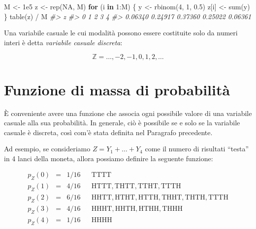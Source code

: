 \documentclass[
  11pt,
]{krantz}
\makeatletter
\newenvironment{Shaded}{\begin{snugshade}}{\end{snugshade}}
\newcommand{\CommentTok}[1]{\textcolor[rgb]{0.37,0.37,0.37}{\textit{#1}}}
\newcommand{\ConstantTok}[1]{\textcolor[rgb]{0,0,0}{#1}}
\newcommand{\ControlFlowTok}[1]{\textcolor[rgb]{0.27,0.27,0.27}{\textbf{#1}}}
\newcommand{\DecValTok}[1]{\textcolor[rgb]{0.06,0.06,0.06}{#1}}
\newcommand{\FloatTok}[1]{\textcolor[rgb]{0.06,0.06,0.06}{#1}}
\newcommand{\FunctionTok}[1]{\textcolor[rgb]{0,0,0}{#1}}
\newcommand{\NormalTok}[1]{#1}
\newcommand{\OtherTok}[1]{\textcolor[rgb]{0.37,0.37,0.37}{#1}}
\newcommand{\SpecialCharTok}[1]{\textcolor[rgb]{0,0,0}{#1}}
\newenvironment{kframe}{%
\medskip{}
\setlength{\fboxsep}{.8em}
 \def\at@end@of@kframe{}%
 \ifinner\ifhmode%
  \def\at@end@of@kframe{\end{minipage}}%
  \begin{minipage}{\columnwidth}%
 \fi\fi%
 \def\FrameCommand##1{\hskip\@totalleftmargin \hskip-\fboxsep
 \colorbox{shadecolor}{##1}\hskip-\fboxsep
     \hskip-\linewidth \hskip-\@totalleftmargin \hskip\columnwidth}%
 \MakeFramed {\advance\hsize-\width
   \@totalleftmargin\z@ \linewidth\hsize
   \@setminipage}}%
 {\par\unskip\endMakeFramed%
 \at@end@of@kframe}
\renewenvironment{Shaded}{\begin{kframe}}{\end{kframe}}
\theoremstyle{definition}
\theoremstyle{definition}
\theoremstyle{definition}
\theoremstyle{definition}
\theoremstyle{remark}
\makeatother
\begin{document}
\begin{Shaded}
\begin{Highlighting}[]
\NormalTok{M }\OtherTok{\textless{}{-}} \FloatTok{1e5}
\NormalTok{z }\OtherTok{\textless{}{-}} \FunctionTok{rep}\NormalTok{(}\ConstantTok{NA}\NormalTok{, M)}
\ControlFlowTok{for}\NormalTok{ (i }\ControlFlowTok{in} \DecValTok{1}\SpecialCharTok{:}\NormalTok{M) \{}
\NormalTok{  y }\OtherTok{\textless{}{-}} \FunctionTok{rbinom}\NormalTok{(}\DecValTok{4}\NormalTok{, }\DecValTok{1}\NormalTok{, }\FloatTok{0.5}\NormalTok{)}
\NormalTok{  z[i] }\OtherTok{\textless{}{-}} \FunctionTok{sum}\NormalTok{(y)}
\NormalTok{\}}
\FunctionTok{table}\NormalTok{(z) }\SpecialCharTok{/}\NormalTok{ M}
\CommentTok{\#\textgreater{} z}
\CommentTok{\#\textgreater{}       0       1       2       3       4 }
\CommentTok{\#\textgreater{} 0.06340 0.24917 0.37360 0.25022 0.06361}
\end{Highlighting}
\end{Shaded}

Una variabile casuale le cui modalità possono essere costituite solo da numeri interi è detta \emph{variabile casuale discreta}:

\[
\mathbb{Z} = \dots, -2, -1, 0, 1, 2, \dots
\]

\hypertarget{sec:fun-mass-prob}{%
\section{Funzione di massa di probabilità}\label{sec:fun-mass-prob}}

È conveniente avere una funzione che associa ogni possibile valore di una variabile casuale alla sua probabilità. In generale, ciò è possibile se e solo se la variabile casuale è discreta, così com'è stata definita nel Paragrafo precedente.

Ad esempio, se consideriamo \(Z = Y_1 + \dots + Y_4\) come il numero di risultati ``testa'' in 4 lanci della moneta, allora possiamo definire la seguente funzione:

\[
\begin{array}{rclll}
p_Z(0) & = & 1/16 & & \mathrm{TTTT}
\\
p_Z(1) & = & 4/16 & & \mathrm{HTTT, THTT, TTHT, TTTH}
\\
p_Z(2) & = & 6/16 & & \mathrm{HHTT, HTHT, HTTH, THHT, THTH, TTTH}
\\
p_Z(3) & = & 4/16 & & \mathrm{HHHT, HHTH, HTHH, THHH}
\\
p_Z(4) & = & 1/16 & & \mathrm{HHHH}
\end{array}
\]
\end{document}
